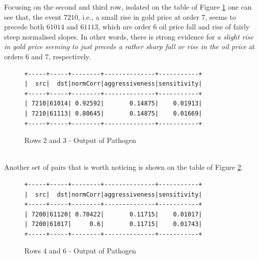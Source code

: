 \documentclass[a4, 11pt]{article}
\begin{document}
Focusing on the second and third row, isolated on the table of Figure \ref{fig:graph2} one can see that, 
the event $7210$, i.e., a small rise in gold price at order $7$, seems to precede both $61014$ and $61113$, which are order $6$ oil price fall and rise of fairly steep normalised slopes. In other words, there is strong evidence for \textit{a slight rise in gold price seeming to just precede a rather sharp fall or rise in the oil price} at orders 6 and 7, respectively.
\begin{figure}[!h]
\centering
    \begin{BVerbatim}[baselinestretch=0.1,fontsize=\fontsize{12}{0}\selectfont]
+-----+-----+--------+--------------+-----------+
|  src|  dst|normCorr|aggressiveness|sensitivity|
+-----+-----+--------+--------------+-----------+
| 7210|61014| 0.92592|       0.14875|    0.01913|
| 7210|61113| 0.80645|       0.14875|    0.01669|
+-----+-----+--------+--------------+-----------+
    \end{BVerbatim}
    \caption{Rows 2 and 3 - Output of Pathogen}
    \label{fig:graph2}
\end{figure}
\\Another set of pairs that is worth noticing is shown on the table of Figure \ref{fig:graph3}.
\begin{figure}[!ht]
\centering
    \begin{BVerbatim}[baselinestretch=0.1,fontsize=\fontsize{12}{0}\selectfont]
+-----+-----+--------+--------------+-----------+
|  src|  dst|normCorr|aggressiveness|sensitivity|
+-----+-----+--------+--------------+-----------+
| 7200|61120| 0.70422|       0.11715|    0.01017|
| 7200|61017|     0.6|       0.11715|    0.01743|
+-----+-----+--------+--------------+-----------+
    \end{BVerbatim}
    \caption{Rows 4 and 6 - Output of Pathogen}
    \label{fig:graph3}
\end{figure}
\end{document}
